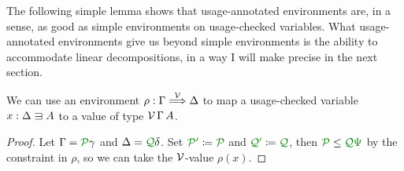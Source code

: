 The following simple lemma shows that usage-annotated environments are, in a
sense, as good as simple environments on usage-checked variables.
What usage-annotated environments give us beyond simple environments is the
ability to accommodate linear decompositions, in a way I will make precise in
the next section.

\begin{lemma}
  We can use an environment $\rho : \Gamma \stackrel{\mathcal V}\Longrightarrow \Delta$ to map a
  usage-checked variable $x : \Delta \sqni A$ to a value of type
  $\mathcal V\,\Gamma\,A$.
\end{lemma}
\begin{proof}
  Let $\Gamma = \grP\gamma$ and $\Delta = \grQ\delta$.
  Set $\grPprime \coloneqq \grP$ and $\grQprime \coloneqq \grQ$, then
  $\grP \leq \grQ\gr\Psi$ by the constraint in $\rho$, so we can take
  the $\mathcal V$-value $\rho(x)$.
\end{proof}
